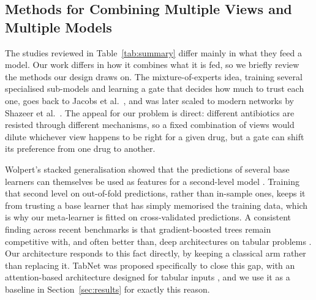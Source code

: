 \documentclass[journal]{IEEEtran}
\begin{document}
\subsection{Methods for Combining Multiple Views and Multiple Models}

The studies reviewed in Table~\ref{tab:summary} differ mainly in what they feed a
model. Our work differs in how it combines what it is fed, so we briefly review the
methods our design draws on. The mixture-of-experts idea, training several
specialised sub-models and learning a gate that decides how much to trust each one,
goes back to Jacobs et al.\ \cite{jacobs1991moe}, and was later scaled to modern
networks by Shazeer et al.\ \cite{shazeer2017moe}. The appeal for our problem is
direct: different antibiotics are resisted through different mechanisms, so a fixed
combination of views would dilute whichever view happens to be right for a given
drug, but a gate can shift its preference from one drug to another.

Wolpert's stacked generalisation showed that the predictions of several base
learners can themselves be used as features for a second-level model
\cite{wolpert1992stacked}. Training that second level on out-of-fold predictions,
rather than in-sample ones, keeps it from trusting a base learner that has simply
memorised the training data, which is why our meta-learner is fitted on
cross-validated predictions. A consistent finding across recent benchmarks is that
gradient-boosted trees remain competitive with, and often better than, deep
architectures on tabular problems \cite{grinsztajn2022trees,shwartzziv2022tabular}.
Our architecture responds to this fact directly, by
keeping a classical arm rather than replacing it. TabNet was proposed specifically
to close this gap, with an attention-based architecture designed for tabular inputs
\cite{arik2021tabnet}, and we use it as a baseline in Section~\ref{sec:results} for
exactly this reason.
\end{document}
